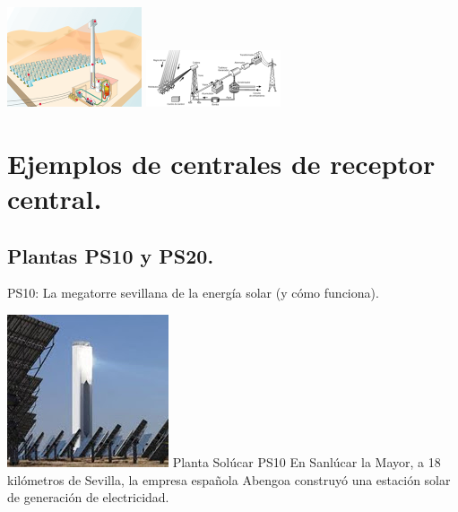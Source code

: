 \includegraphics[scale=1]{unnamed.png}
\includegraphics[scale=1]{unnamed (1).png}

\section{Ejemplos de centrales de receptor central.}
\subsection{Plantas PS10 y PS20.}

PS10: La megatorre sevillana de la energía solar (y cómo funciona).

\includegraphics[scale=1]{unnamed (4).jpg}
Planta Solúcar PS10
En Sanlúcar la Mayor, a 18 kilómetros de Sevilla, la empresa española Abengoa construyó una estación solar de generación de electricidad.

